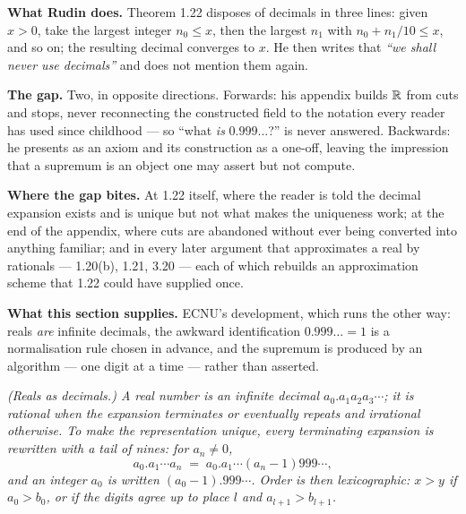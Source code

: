 \begin{roadmap}
\raggedright
\textbf{What Rudin does.} Theorem 1.22 disposes of decimals in three lines:
given $x>0$, take the largest integer $n_0 \le x$, then the largest $n_1$
with $n_0 + n_1/10 \le x$, and so on; the resulting decimal converges to $x$.
He then writes that \emph{``we shall never use decimals''} and does not
mention them again.

\smallskip
\textbf{The gap.} Two, in opposite directions. Forwards: his appendix builds
$\mathbb{R}$ from cuts and stops, never reconnecting the constructed field to the
notation every reader has used since childhood --- so ``what \emph{is}
$0.999\ldots$?'' is never answered. Backwards: he presents \lub{} as an
axiom and its construction as a one-off, leaving the impression that a
supremum is an object one may assert but not compute.

\smallskip
\textbf{Where the gap bites.} At 1.22 itself, where the reader is told the
decimal expansion exists and is unique but not what makes the uniqueness
work; at the end of the appendix, where cuts are abandoned without ever
being converted into anything familiar; and in every later argument that
approximates a real by rationals --- 1.20(b), 1.21, 3.20 --- each of which
rebuilds an approximation scheme that 1.22 could have supplied once.

\smallskip
\textbf{What this section supplies.} ECNU's development, which runs the other
way: reals \emph{are} infinite decimals, the awkward identification
$0.999\ldots = 1$ is a normalisation rule chosen in advance, and the
supremum is produced by an algorithm --- one digit at a time --- rather than
asserted.
\end{roadmap}

\emph{(Reals as decimals.) A real number is an infinite decimal
$a_0.a_1a_2a_3\cdots$; it is rational when the expansion terminates or
eventually repeats and irrational otherwise. To make the representation
unique, every terminating expansion is rewritten with a tail of nines:
for $a_n \ne 0$,}
\[ a_0.a_1\cdots a_n \;=\; a_0.a_1\cdots(a_n-1)999\cdots , \]
\emph{and an integer $a_0$ is written $(a_0-1).999\cdots$. Order is then
lexicographic: $x > y$ if $a_0 > b_0$, or if the digits agree up to place
$l$ and $a_{l+1} > b_{l+1}$.}

